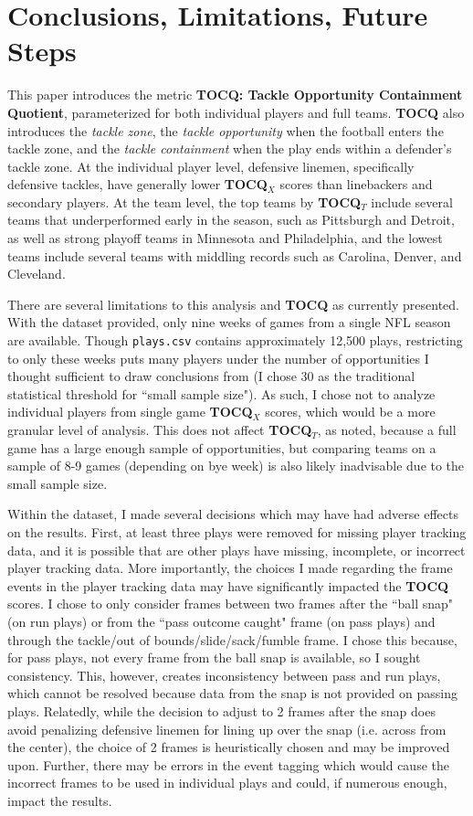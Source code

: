 \documentclass{article}
\begin{document}
\section{Conclusions, Limitations, Future Steps}

This paper introduces the metric \textbf{TOCQ: Tackle Opportunity Containment Quotient}, parameterized for both individual players and full teams. \textbf{TOCQ} also introduces the \textit{tackle zone}, the \textit{tackle opportunity} when the football enters the tackle zone, and the \textit{tackle containment} when the play ends within a defender's tackle zone. At the individual player level, defensive linemen, specifically defensive tackles, have generally lower \textbf{TOCQ$_X$} scores than linebackers and secondary players. At the team level, the top teams by \textbf{TOCQ$_T$} include several teams that underperformed early in the season, such as Pittsburgh and Detroit, as well as strong playoff teams in Minnesota and Philadelphia, and the lowest teams include several teams with middling records such as Carolina, Denver, and Cleveland.

There are several limitations to this analysis and \textbf{TOCQ} as currently presented. With the dataset provided, only nine weeks of games from a single NFL season are available. Though \texttt{plays.csv} contains approximately 12,500 plays, restricting to only these weeks puts many players under the number of opportunities I thought sufficient to draw conclusions from (I chose 30 as the traditional statistical threshold for ``small sample size"). As such, I chose not to analyze individual players from single game \textbf{TOCQ$_X$} scores, which would be a more granular level of analysis. This does not affect \textbf{TOCQ$_T$}, as noted, because a full game has a large enough sample of opportunities, but comparing teams on a sample of 8-9 games (depending on bye week) is also likely inadvisable due to the small sample size.

Within the dataset, I made several decisions which may have had adverse effects on the results. First, at least three plays were removed for missing player tracking data, and it is possible that are other plays have missing, incomplete, or incorrect player tracking data. More importantly, the choices I made regarding the frame events in the player tracking data may have significantly impacted the \textbf{TOCQ} scores. I chose to only consider frames between two frames after the ``ball snap" (on run plays) or from the ``pass outcome caught" frame (on pass plays) and through the tackle/out of bounds/slide/sack/fumble frame. I chose this because, for pass plays, not every frame from the ball snap is available, so I sought consistency. This, however, creates inconsistency between pass and run plays, which cannot be resolved because data from the snap is not provided on passing plays. Relatedly, while the decision to adjust to 2 frames after the snap does avoid penalizing defensive linemen for lining up over the snap (i.e. across from the center), the choice of 2 frames is heuristically chosen and may be improved upon. Further, there may be errors in the event tagging which would cause the incorrect frames to be used in individual plays and could, if numerous enough, impact the results.
\end{document}
